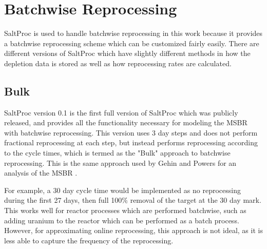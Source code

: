 
\renewcommand*\descriptionlabel[1]{\hspace\leftmargin$#1$}
\setcounter{tocdepth}{5}
\setcounter{secnumdepth}{5}


 
 

\section{Batchwise Reprocessing}

SaltProc is used to handle batchwise reprocessing in this work because it provides a batchwise reprocessing scheme which can be customized fairly easily. There are different versions of SaltProc which have slightly different methods in how the depletion data is stored as well as how reprocessing rates are calculated.

\subsection{Bulk}

SaltProc version 0.1 is the first full version of SaltProc which was publicly released, and provides all the functionality necessary for modeling the MSBR with batchwise reprocessing. This version uses 3 day steps and does not perform fractional reprocessing at each step, but instead performs reprocessing according to the cycle times, which is termed as the "Bulk" approach to batchwise reprocessing. This is the same approach used by Gehin and Powers for an analysis of the MSBR \cite{gehin_liquid_2016}.

For example, a 30 day cycle time would be implemented as no reprocessing during the first 27 days, then full 100\% removal of the target at the 30 day mark. This works well for reactor processes which are performed batchwise, such as adding uranium to the reactor which can be performed as a batch process. However, for approximating online reprocessing, this approach is not ideal, as it is less able to capture the frequency of the reprocessing.


